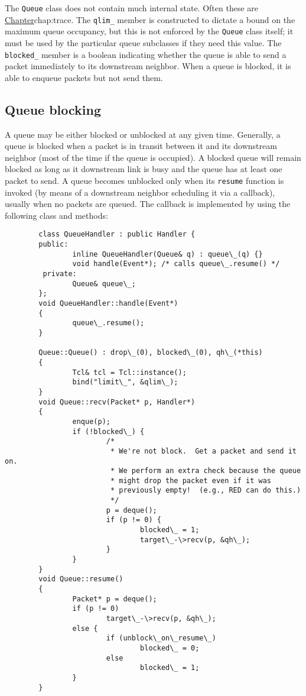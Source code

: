 The {\tt Queue} class does not contain much internal state.
Often these are
\href{special monitoring objects}{Chapter}{chap:trace}.
The {\tt qlim\_} member is constructed to dictate a bound on the maximum
queue occupancy, but this is not enforced by the {\tt Queue} class itself; it
must be used by the particular queue subclasses if they need this value.
The {\tt blocked\_} member is a boolean indicating whether the
queue is able to send a packet immediately to its downstream neighbor.
When a queue is blocked, it is able to enqueue packets but not send them.

\subsection{Queue blocking}
\label{sec:qblock}

A queue may be either blocked or unblocked at any given time.
Generally, a queue is blocked when a packet is in transit between it
and its downstream neighbor (most of the time if the queue is occupied).
A blocked queue will remain blocked as long as it downstream link is
busy and the queue has at least one packet to send.
A queue becomes unblocked only when its {\tt resume} function is
invoked (by means of a downstream neighbor scheduling it via
a callback), usually when no packets are queued.
The callback is implemented by using the following class and
methods:
\begin{verbatim}
        class QueueHandler : public Handler {
        public:
                inline QueueHandler(Queue& q) : queue\_(q) {}
                void handle(Event*); /* calls queue\_.resume() */
         private:
                Queue& queue\_;
        };
        void QueueHandler::handle(Event*)
        {
                queue\_.resume();
        }

        Queue::Queue() : drop\_(0), blocked\_(0), qh\_(*this)
        {
                Tcl& tcl = Tcl::instance();
                bind("limit\_", &qlim\_);
        }
        void Queue::recv(Packet* p, Handler*)
        {
                enque(p);
                if (!blocked\_) {
                        /*
                         * We're not block.  Get a packet and send it on.
                         * We perform an extra check because the queue
                         * might drop the packet even if it was
                         * previously empty!  (e.g., RED can do this.)
                         */
                        p = deque();
                        if (p != 0) {
                                blocked\_ = 1;
                                target\_-\>recv(p, &qh\_);
                        }
                }
        }
        void Queue::resume()
        {
                Packet* p = deque();
                if (p != 0)
                        target\_-\>recv(p, &qh\_);
                else {
                        if (unblock\_on\_resume\_)
                                blocked\_ = 0;
                        else
                                blocked\_ = 1;
                }
        }
\end{verbatim}
